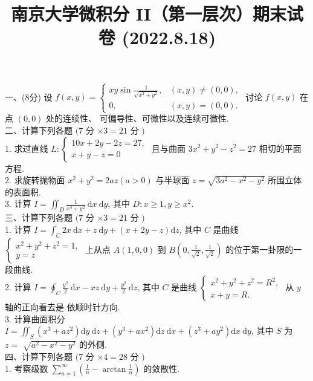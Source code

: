 \documentclass[a3paper, 11pt ,UTF8]{article}
\title{南京大学微积分 II（第一层次）期末试卷 (2022.8.18)\vspace{-2em}}
\date{}
\begin{document}
\maketitle
\noindent 一、(8分) 设 $\displaystyle f(x, y)=\left\{\begin{array}{ll}x y \sin \displaystyle\frac{1}{\sqrt{x^2+y^2}}, & (x, y) \neq(0,0), \\ 0, & (x, y)=(0,0) .\end{array}\right.$ 讨论 $f(x, y)$ 在点 $(0,0)$ 处的连续性、 可偏导性、可微性以及连续可微性.\\
二、计算下列各题 $(7$ 分 $\times 3=21$ 分 $)$\\
1. 求过直线 $L:\left\{\begin{array}{l}10 x+2 y-2 z=27, \\ x+y-z=0\end{array}\right.$ 且与曲面 $3 x^2+y^2-z^2=27$ 相切的平面方程.\\
2. 求旋转抛物面 $x^2+y^2=2 a z(a>0)$ 与半球面 $z=\sqrt{3 a^2-x^2-y^2}$ 所围立体的表面积.\\
3. 计算 $\displaystyle I=\iint_D \frac{1}{x^4+y^2} \mathrm{~d} x \mathrm{~d} y$, 其中 $D: x \geq 1, y \geq x^2$.\\
三、计算下列各题 $(7$ 分 $\times 3=21$ 分 $)$\\
1. 计算 $\displaystyle I=\int_C 2 x \mathrm{~d} x+z \mathrm{~d} y+(x+2 y-z) \mathrm{d} z$, 其中 $C$ 是曲线 $\left\{\begin{array}{l}x^2+y^2+z^2=1, \\ y=z\end{array}\right.$ 上从点 $A(1,0,0)$ 到 $B\left(0, \frac{1}{\sqrt{2}}, \frac{1}{\sqrt{2}}\right)$ 的位于第一卦限的一段曲线.\\
2. 计算 $\displaystyle I=\oint_C \frac{y^2}{2} \mathrm{~d} x-x z \mathrm{~d} y+\frac{y^2}{2} \mathrm{~d} z$, 其中 $C$ 是曲线 $\left\{\begin{array}{l}x^2+y^2+z^2=R^2, \\ x+y=R .\end{array}\right.$ 从 $y$ 轴的正向看去是 依顺时针方向.\\
3. 计算曲面积分 $\displaystyle I=\iint_S\left(x^3+a z^2\right) \mathrm{d} y \mathrm{~d} z+\left(y^3+a x^2\right) \mathrm{d} z \mathrm{~d} x+\left(z^3+a y^2\right) \mathrm{d} x \mathrm{~d} y$, 其中 $S$ 为 $z=$ $\sqrt{a^2-x^2-y^2}$ 的外侧.\\
四、计算下列各题 $(7$ 分 $\times 4=28$ 分 $)$\\
1. 考察级数 $\displaystyle\sum_{n=1}^{\infty}\left(\frac{1}{n}-\arctan \frac{1}{n}\right)$ 的敛散性.\\
\end{document}
